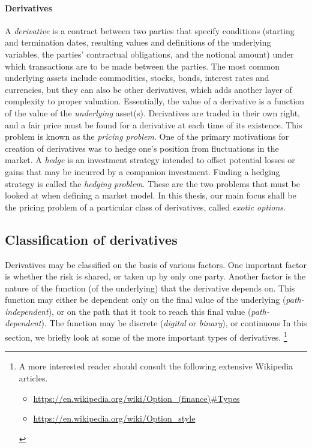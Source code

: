 \paragraph{Derivatives}
A \emph{derivative} is a contract between two parties that specify conditions (starting and termination dates, resulting values and definitions of the underlying variables, the parties' contractual obligations, and the notional amount) under which transactions are to be made between the parties. The most common underlying assets include commodities, stocks, bonds, interest rates and currencies, but they can also be other derivatives, which adds another layer of complexity to proper valuation. Essentially, the value of a derivative is a function of the value of the \emph{underlying} asset(s). Derivatives are traded in their own right, and a fair price must be found for a derivative at each time of its existence. This problem is known as the \emph{pricing problem}. One of the primary motivations for creation of derivatives was to hedge one's position from fluctuations in the market. A \emph{hedge} is an investment strategy intended to offset potential losses or gains that may be incurred by a companion investment. Finding a hedging strategy is called the \emph{hedging problem}. These are the two problems that must be looked at when defining a market model. In this thesis, our main focus shall be the pricing problem of a particular class of derivatives, called \emph{exotic options}.


\subsection{Classification of derivatives}
\label{subsec:intro-derivative-classification}

Derivatives may be classified on the basis of various factors. One important factor is whether the risk is shared, or taken up by only one party. Another factor is the nature of the function (of the underlying) that the derivative depends on. This function may either be dependent only on the final value of the underlying (\emph{path-independent}), or on the path that it took to reach this final value (\emph{path-dependent}). The function may be discrete (\emph{digital} or \emph{binary}), or continuous In this section, we briefly look at some of the more important types of derivatives. \footnote{
	A more interested reader should consult the following extensive Wikipedia articles.
	\begin{itemize}
		\item \url{https://en.wikipedia.org/wiki/Option_(finance)\#Types}
		\item \url{https://en.wikipedia.org/wiki/Option_style}
	\end{itemize}
}



